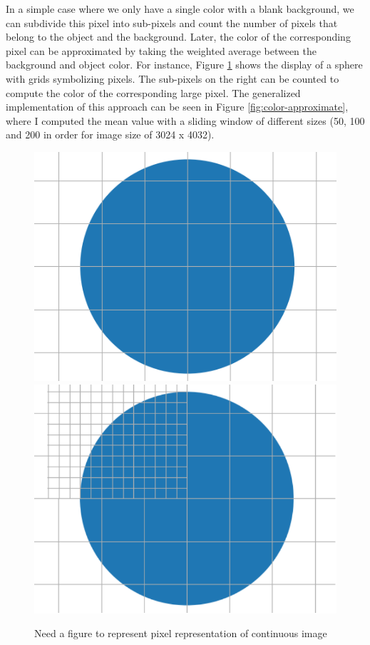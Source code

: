 In a simple case where we only have a single color with a blank background, we can subdivide this pixel into sub-pixels and count the number of pixels that belong to the object and the background. Later, the color of the corresponding pixel can be approximated by taking the weighted average between the background and object color. For instance, Figure \ref{fig:display-grid} shows the display of a sphere with grids symbolizing pixels. The sub-pixels on the right can be counted to compute the color of the corresponding large pixel. The generalized implementation of this approach can be seen in Figure \ref{fig:color-approximate}, where I computed the mean value with a sliding window of different sizes (50, 100 and 200 in order for image size of 3024 x 4032).


\begin{figure}
  \centering
   \includegraphics[width=0.4\linewidth]{Images/grid_circle.png}
    \includegraphics[width=0.4\linewidth]{Images/merged_grid_circle2-crop.pdf}

   \caption{Need a figure to represent pixel representation of continuous image}
   \label{fig:display-grid}
\end{figure}


